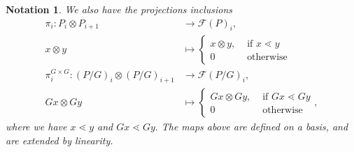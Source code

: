 \documentclass{amsart}
\newtheorem{note}[subsubsection]{Notation}
\begin{document}
\begin{note}
We also have the projections inclusions
\begin{align*}
	\pi_i:P_i \otimes P_{i+1} & \rightarrow \mathcal F(P)_{i},\\
	x\otimes y &\mapsto  \begin{cases}
	x\otimes y, &\text{ if }x\lessdot y\\
	0 &\text { otherwise}
\end{cases}\\
	\pi_i^{G\times G}: (P/G)_i \otimes (P/G)_{i+1} &\rightarrow\mathcal F(P/G)_i,\\
	Gx\otimes Gy &\mapsto \begin{cases}
	Gx\otimes Gy, &\text{ if }Gx\lessdot Gy\\
	0 &\text { otherwise}
\end{cases},
\end{align*}
where we have $x \lessdot y$ and $Gx \lessdot Gy.$ The maps above are defined on a basis, and are extended by linearity.
\end{note}
\end{document}
